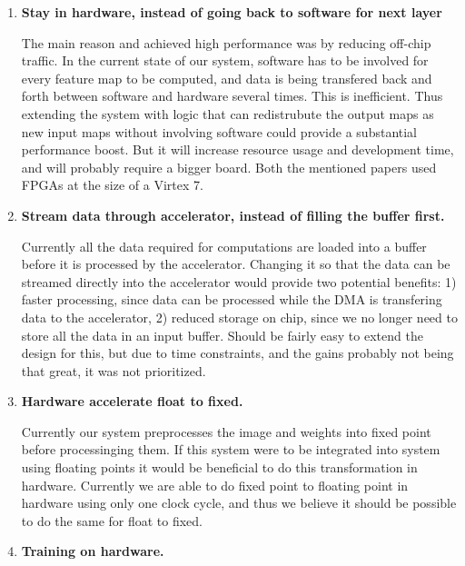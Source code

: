 \begin{enumerate}
	\item \textbf{Stay in hardware, instead of going back to software for next layer}
	
	The main reason \cite{Virtex_paper} and \cite{Microsoft_paper} achieved high performance was by reducing off-chip traffic. In the current state of our system, software has to be involved for every feature map to be computed, and data is being transfered back and forth between software and hardware several times. This is inefficient. Thus extending the system with logic that can redistrubute the output maps as new input maps without involving software could provide a substantial performance boost. But it will increase resource usage and development time, and will probably require a bigger board. Both the mentioned papers used FPGAs at the size of a Virtex 7.  
	
	\item \textbf{Stream data through accelerator, instead of filling the buffer first.}
	
	Currently all the data required for computations are loaded into a buffer before it is processed by the accelerator. Changing it so that the data can be streamed directly into the accelerator would provide two potential benefits: 1) faster processing, since data can be processed while the DMA is transfering data to the accelerator, 2) reduced storage on chip, since we no longer need to store all the data in an input buffer. Should be fairly easy to extend the design for this, but due to time constraints, and the gains probably not being that great, it was not prioritized. 
	
	\item \textbf{Hardware accelerate float to fixed.}
	
	Currently our system preprocesses the image and weights into fixed point before processinging them. If this system were to be integrated into system using floating points it would be beneficial to do this transformation in hardware. Currently we are able to do fixed point to floating point in hardware using only one clock cycle, and thus we believe it should be possible to do the same for float to fixed. 
	
	\item \textbf{Training on hardware.}
	
\end{enumerate}
